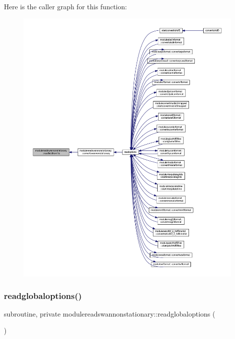 Here is the caller graph for this function\+:\nopagebreak
\begin{figure}[H]
\begin{center}
\leavevmode
\includegraphics[width=350pt]{namespacemodulereadswannonstationary_ab9855fa733bd4b591442908062b5e2cd_icgraph}
\end{center}
\end{figure}
\mbox{\label{namespacemodulereadswannonstationary_a3ca3fa603083a13bf688eeba197ef307}} 
\subsubsection{\texorpdfstring{readglobaloptions()}{readglobaloptions()}}
{\footnotesize\ttfamily subroutine, private modulereadswannonstationary\+::readglobaloptions (\begin{DoxyParamCaption}{ }\end{DoxyParamCaption})\hspace{0.3cm}{\ttfamily [private]}}

